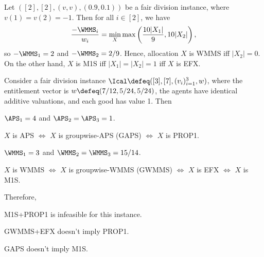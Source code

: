 \begin{example}
\label{cex:wmms-plus-m1s-chores}
Let $([2], [2], (v, v), (0.9, 0.1))$ be a fair division instance, where $v(1) = v(2) = -1$.
Then for all $i \in [2]$, we have
\[ \frac{-\WMMS_i}{w_i} = \min_X \max\left(\frac{10|X_1|}{9}, 10|X_2|\right), \]
so $-\WMMS_1 = 2$ and $-\WMMS_2 = 2/9$.
Hence, allocation $X$ is WMMS iff $|X_2| = 0$.
On the other hand, $X$ is M1S iff $|X_1| = |X_2| = 1$ iff $X$ is EFX.
\end{example}

\begin{lemma}
\label{cex:prop1-plus-m1s-ue}
Consider a fair division instance $\Ical \defeq ([3], [7], (v_i)_{i=1}^3, w)$,
where the entitlement vector is $w \defeq (7/12, 5/24, 5/24)$,
the agents have identical additive valuations, and each good has value 1. Then
\begin{tightenum}
\item $\APS_1 = 4$ and $\APS_2 = \APS_3 = 1$.
\item $X$ is APS $\iff$ $X$ is groupwise-APS (GAPS) $\iff$ $X$ is PROP1.
\item $\WMMS_1 = 3$ and $\WMMS_2 = \WMMS_3 = 15/14$.
\item $X$ is WMMS $\iff$ $X$ is groupwise-WMMS (GWMMS) $\iff$ $X$ is EFX $\iff$ $X$ is M1S.
\end{tightenum}
Therefore,
\begin{tightenum}
\item M1S+PROP1 is infeasible for this instance.
\item GWMMS+EFX doesn't imply PROP1.
\item GAPS doesn't imply M1S.
\end{tightenum}
\end{lemma}
